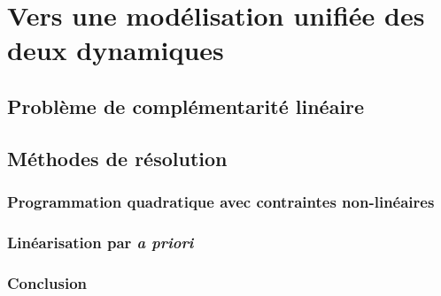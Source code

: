 	\section{Vers une modélisation unifiée des deux dynamiques}
		\subsection{Problème de complémentarité linéaire}
		\subsection{Méthodes de résolution}
			\subsubsection{Programmation quadratique avec contraintes non-linéaires}
			\subsubsection{Linéarisation par \textit{a priori}}
			\subsubsection{Conclusion}